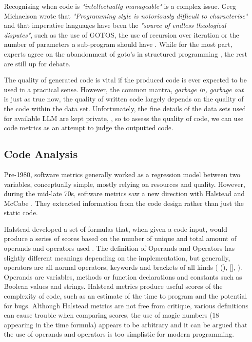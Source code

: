 \documentclass[manuscript,screen,review,sigconf]{acmart}
\begin{document}
Recognising when code is \textit{"intellectually manageable"} is a complex issue. Greg Michaelson wrote that \textit{"Programming style is notoriously difficult to characterise"} and that imperative languages have been the \textit{"source of endless theological disputes"}, such as the use of GOTOS, the use of recursion over iteration or the number of parameters a sub-program should have \cite{Automatic_analysis}. While for the most part, experts agree on the abandonment of goto's in structured programming \cite{gotoConsideredHarmful, KnuthGoTo}, the rest are still up for debate.

The quality of generated code is vital if the produced code is ever expected to be used in a practical sense. However, the common mantra, \textit{garbage in, garbage out} is just as true now, the quality of written code largely depends on the quality of the code within the data set. Unfortunately,  the fine details of the data sets used for available LLM are kept private, \cite{SysEvaOfLLMofCode}, so to assess the quality of code, we can use code metrics as an attempt to judge the outputted code.


\subsection{Code Analysis}
Pre-1980, software metrics generally worked as a regression model between two variables, conceptually simple, mostly relying on resources and quality. However, during the mid-late 70s, software metrics saw a new direction with Halstead and McCabe \cite{FENTON1999149}. They extracted information from the code design rather than just the static code.

Halstead developed a set of formulas that, when given a code input, would produce a series of scores based on the number of unique and total amount of operands and operators used \cite{Halstead}. The definition of Operands and Operators has slightly different meanings depending on the implementation, but generally, operators are all normal operators, keywords and brackets of all kinds ( (), [], {} ). Operands are variables, methods or function declarations and constants such as Boolean values and strings. Halstead metrics produce useful scores of the complexity of code, such as an estimate of the time to program and the potential for bugs. Although Halstead metrics are not free from critique, various definitions can cause trouble when comparing scores, the use of magic numbers (18 appearing in the time formula) appears to be arbitrary and it can be argued that the use of operands and operators is too simplistic for modern programming.
\end{document}
